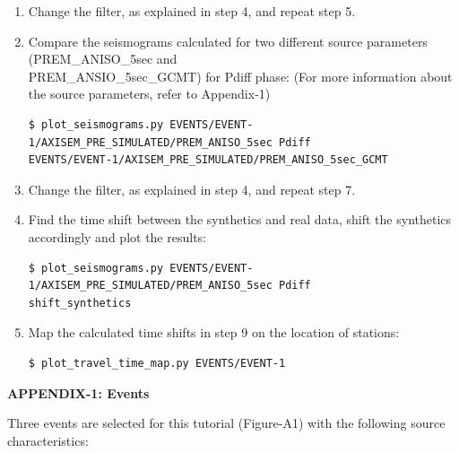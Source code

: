 \documentclass{article}
\begin{document}
\begin{enumerate}
\item Change the filter, as explained in step 4, and repeat step 5.

\item Compare the seismograms calculated for two different source parameters (PREM\_ANISO\_5sec and \\
PREM\_ANSIO\_5sec\_GCMT) for Pdiff phase: (For more information about the source 
parameters, refer to Appendix-1)

\begin{lstlisting}
$ plot_seismograms.py EVENTS/EVENT-1/AXISEM_PRE_SIMULATED/PREM_ANISO_5sec Pdiff 
EVENTS/EVENT-1/AXISEM_PRE_SIMULATED/PREM_ANISO_5sec_GCMT
\end{lstlisting}

\item Change the filter, as explained in step 4, and repeat step 7.

\item Find the time shift between the synthetics and real data, shift the synthetics 
accordingly and plot the results:

\begin{lstlisting}
$ plot_seismograms.py EVENTS/EVENT-1/AXISEM_PRE_SIMULATED/PREM_ANISO_5sec Pdiff 
shift_synthetics
\end{lstlisting}

\item Map the calculated time shifts in step 9 on the location of stations:

\begin{lstlisting}
$ plot_travel_time_map.py EVENTS/EVENT-1
\end{lstlisting}

\end{enumerate}

\newpage
{\large{}\textbf{APPENDIX-1: Events}}

Three events are selected for this tutorial (Figure-A1) with the following source 
characteristics:
\end{document}
